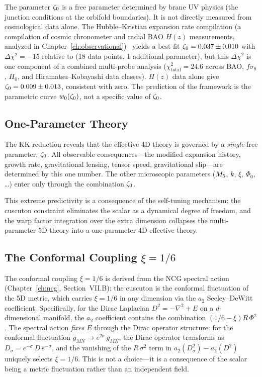 The parameter $\zeta_0$ is a free parameter determined by brane UV physics (the junction conditions at the orbifold boundaries). It is not directly measured from cosmological data alone. The Hubble--Kristian expansion rate compilation (a compilation of cosmic chronometer and radial BAO $H(z)$ measurements, analyzed in Chapter~\ref{ch:observational})~\cite{ch1:hk-compilation} yields a best-fit $\zeta_0 = 0.037 \pm 0.010$ with $\Delta\chi^2 = -15$ relative to \LCDM{} (18 data points, 1 additional parameter), but this $\Delta\chi^2$ is one component of a combined multi-probe analysis ($\chi^2_{\mathrm{total}} = 24.6$ across BAO, $f\sigma_8$, $H_0$, and Hiramatsu--Kobayashi data classes). $H(z)$ data alone give $\zeta_0 = 0.009 \pm 0.013$, consistent with zero. The prediction of the framework is the parametric curve $w_0(\zeta_0)$, not a specific value of $\zeta_0$.

\subsection{One-Parameter Theory}
\label{sec:1-one-param}

The KK reduction reveals that the effective 4D theory is governed by a \emph{single} free parameter, $\zeta_0$. All observable consequences---the modified expansion history, growth rate, gravitational lensing, tensor speed, gravitational slip---are determined by this one number. The other microscopic parameters ($M_5$, $k$, $\xi$, $\Phi_0$, \ldots) enter only through the combination $\zeta_0$.

This extreme predictivity is a consequence of the self-tuning mechanism: the cuscuton constraint eliminates the scalar as a dynamical degree of freedom, and the warp factor integration over the extra dimension collapses the multi-parameter 5D theory into a one-parameter 4D effective theory.

\subsection{The Conformal Coupling \texorpdfstring{$\xi = 1/6$}{xi = 1/6}}
\label{sec:1-conformal-coupling}

The conformal coupling $\xi = 1/6$ is derived from the NCG spectral action (Chapter~\ref{ch:ncg}, Section~VII.B): the cuscuton is the conformal fluctuation of the 5D metric, which carries $\xi = 1/6$ in any dimension via the $a_2$ Seeley--DeWitt coefficient.  Specifically, for the Dirac Laplacian $D^2 = -\nabla^2 + E$ on a $d$-dimensional manifold, the $a_2$ coefficient contains the combination $(1/6 - \xi)R\,\Phi^2$. The spectral action \emph{fixes} $E$ through the Dirac operator structure: for the conformal fluctuation $g_{MN} \to e^{2\sigma}\, g_{MN}$, the Dirac operator transforms as $D_\sigma = e^{-\sigma}\, D\, e^{-\sigma}$, and the vanishing of the $R\,\sigma^2$ term in $a_2(D_\sigma^2) - a_2(D^2)$ uniquely selects $\xi = 1/6$. This is not a choice---it is a consequence of the scalar being a metric fluctuation rather than an independent field.

